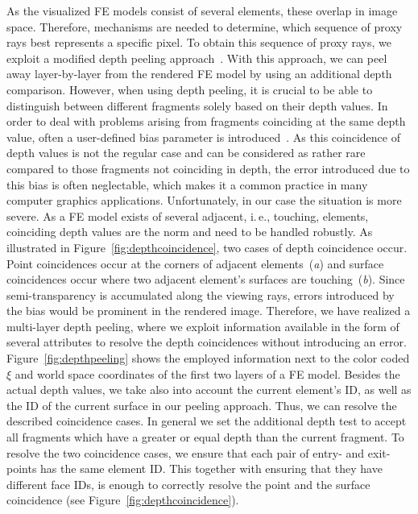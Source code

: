 \documentclass[review,journal]{vgtc}         %
\begin{document}
As the visualized FE models consist of several elements, these overlap in image space. Therefore, mechanisms are needed to determine, which sequence of proxy rays best represents a specific pixel. To obtain this sequence of proxy rays, we exploit a modified depth peeling approach~\cite{mammen89DepthPeeling}. With this approach, we can peel away layer-by-layer from the rendered FE model by using an additional depth comparison. However, when using depth peeling, it is crucial to be able to distinguish between different fragments solely based on their depth values. In order to deal with problems arising from fragments coinciding at the same depth value, often a user-defined bias parameter is introduced~\cite{Everitt01interactiveorder-independent}. As this coincidence of depth values is not the regular case and can be considered as rather rare compared to those fragments not coinciding in depth, the error introduced due to this bias is often neglectable, which makes it a common practice in many computer graphics applications. Unfortunately, in our case the situation is more severe. As a FE model exists of several adjacent, i.\,e., touching, elements, coinciding depth values are the norm and need to be handled robustly. As illustrated in Figure~\ref{fig:depthcoincidence}, two cases of depth coincidence occur. Point coincidences occur at the corners of adjacent elements~({\it a}) and surface coincidences occur where two adjacent element's surfaces are touching~({\it b}). Since semi-transparency is accumulated along the viewing rays, errors introduced by the bias would be prominent in the rendered image. Therefore, we have realized a multi-layer depth peeling, where we exploit information available in the form of several attributes to resolve the depth coincidences without introducing an error. Figure~\ref{fig:depthpeeling} shows the employed information next to the color coded $\xi$ and world space coordinates of the first two layers of a FE model. Besides the actual depth values, we take also into account the current element's ID, as well as the ID of the current surface in our peeling approach. Thus, we can resolve the described coincidence cases. In general we set the additional depth test to accept all fragments which have a greater or equal depth than the current fragment. To resolve the two coincidence cases, we ensure that each pair of entry- and exit-points has the same element ID. This together with ensuring that they have different face IDs, is enough to correctly resolve the point and the surface coincidence (see Figure~\ref{fig:depthcoincidence}).
\end{document}
